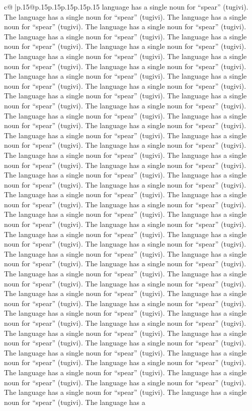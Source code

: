 \documentclass{article}
\begin{document}
{\begin{supertabular}{c@{$\;$}|p{.15\linewidth}@{}p{.15\linewidth}p{.15\linewidth}p{.15\linewidth}p{.15\linewidth}p{.15\linewidth}}
{{{language has a single noun for “spear” (tugivi). The language has a single noun for “spear” (tugivi). The language has a single noun for “spear” (tugivi). The language has a single noun for “spear” (tugivi). The language has a single noun for “spear” (tugivi). The language has a single noun for “spear” (tugivi). The language has a single noun for “spear” (tugivi). The language has a single noun for “spear” (tugivi). The language has a single noun for “spear” (tugivi). The language has a single noun for “spear” (tugivi). The language has a single noun for “spear” (tugivi). The language has a single noun for “spear” (tugivi). The language has a single noun for “spear” (tugivi). The language has a single noun for “spear” (tugivi). The language has a single noun for “spear” (tugivi). The language has a single noun for “spear” (tugivi). The language has a single noun for “spear” (tugivi). The language has a single noun for “spear” (tugivi). The language has a single noun for “spear” (tugivi). The language has a single noun for “spear” (tugivi). The language has a single noun for “spear” (tugivi). The language has a single noun for “spear” (tugivi). The language has a single noun for “spear” (tugivi). The language has a single noun for “spear” (tugivi). The language has a single noun for “spear” (tugivi). The language has a single noun for “spear” (tugivi). The language has a single noun for “spear” (tugivi). The language has a single noun for “spear” (tugivi). The language has a single noun for “spear” (tugivi). The language has a single noun for “spear” (tugivi). The language has a single noun for “spear” (tugivi). The language has a single noun for “spear” (tugivi). The language has a single noun for “spear” (tugivi). The language has a single noun for “spear” (tugivi). The language has a single noun for “spear” (tugivi). The language has a single noun for “spear” (tugivi). The language has a single noun for “spear” (tugivi). The language has a single noun for “spear” (tugivi). The language has a single noun for “spear” (tugivi). The language has a single noun for “spear” (tugivi). The language has a single noun for “spear” (tugivi). The language has a single noun for “spear” (tugivi). The language has a single noun for “spear” (tugivi). The language has a single noun for “spear” (tugivi). The language has a single noun for “spear” (tugivi). The language has a single noun for “spear” (tugivi). The language has a single noun for “spear” (tugivi). The language has a single noun for “spear” (tugivi). The language has a single noun for “spear” (tugivi). The language has a single noun for “spear” (tugivi). The language has a single noun for “spear” (tugivi). The language has a single noun for “spear” (tugivi). The language has a single noun for “spear” (tugivi). The language has a single noun for “spear” (tugivi). The language has a single noun for “spear” (tugivi). The language has a single noun for “spear” (tugivi). The language has a single noun for “spear” (tugivi). The language has a single noun for “spear” (tugivi). The language has a single noun for “spear” (tugivi). The language has a single noun for “spear” (tugivi). The language has a }}}
\end{supertabular}}
\end{document}
